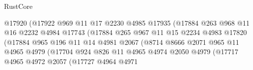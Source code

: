\begin{lexlean}{RustCore}
\begin{coremodule}
                                    @17920
                                    (@17922
                                      @969
                                      @11
                                      @17
                                      @2230
                                      @4985
                                      @17935
                                      (@17884
                                        @263
                                        @968
                                        @11
                                        @16
                                        @2232
                                        @4984
                                        @17743
                                        (@17884
                                          @265
                                          @967
                                          @11
                                          @15
                                          @2234
                                          @4983
                                          @17820
                                          (@17884
                                            @965
                                            @196
                                            @11
                                            @14
                                            @4981
                                            @2067
                                            (@8714
                                              @8666
                                              @2071
                                              @965
                                              @11
                                              @4965
                                              @4979
                                              (@17704
                                                @924
                                                @826
                                                @11
                                                @4965
                                                @4974
                                                @2050
                                                @4979
                                                (@17717
                                                  @4965
                                                  @4972
                                                  @2057
                                                  (@17727
                                                    @4964
                                                    @4971

\end{coremodule}
\end{lexlean}

